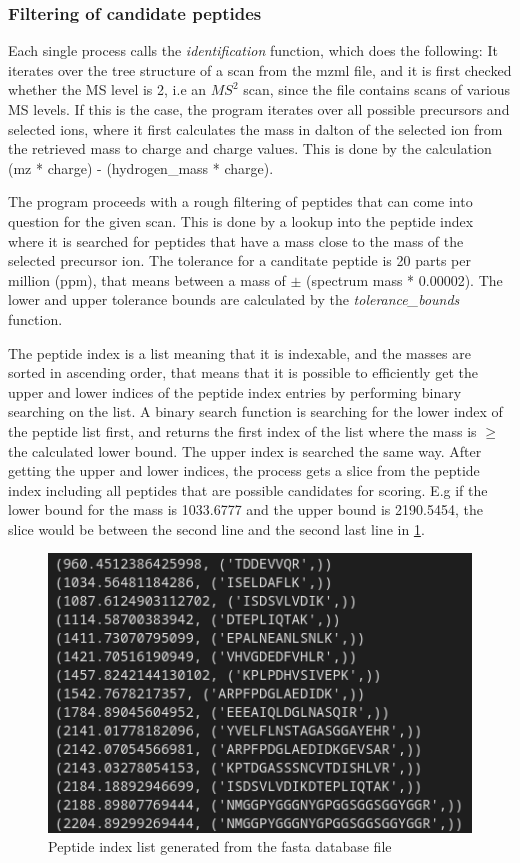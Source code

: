 \documentclass[11pt]{article}
\begin{document}
\subsubsection{Filtering of candidate peptides}
Each single process calls the \textit{identification} function, which does the following:
It iterates over the tree structure of a scan from the mzml file, and it is first checked whether the MS level is 2, i.e an \(MS^2\) scan, since the file contains scans of various MS levels. If this is the case, the program iterates over all possible precursors and selected ions, where it first calculates the mass in dalton of the selected ion from the retrieved mass to charge and charge values. This is done by the calculation (mz * charge) - (hydrogen\_mass * charge).

The program proceeds with a rough filtering of peptides that can come into question for the given scan. This is done by a lookup into the peptide index where it is searched for peptides that have a mass close to the mass of the selected precursor ion. The tolerance for a canditate peptide is 20 parts per million (ppm), that means between a mass of $\pm$ (spectrum mass * 0.00002). The lower and upper tolerance bounds are calculated by the \textit{tolerance\_bounds} function. 

The peptide index is a list meaning that it is indexable, and the masses are sorted in ascending order, that means that it is possible to efficiently get the upper and lower indices of the peptide index entries by performing binary searching on the list. A binary search function is searching for the lower index of the peptide list first, and returns the first index of the list where the mass is $\ge$ the calculated lower bound. The upper index is searched the same way. After getting the upper and lower indices, the process gets a slice from the peptide index including all peptides that are possible candidates for scoring. E.g if the lower bound for the mass is 1033.6777 and the upper bound is 2190.5454, the slice would be between the second line and the second last line in \cref{fig:peptindex}.
\begin{figure}
\includegraphics[width=\linewidth]{figs/peptindex.png} 
\caption{Peptide index list generated from the fasta database file}
\label{fig:peptindex}
\end{figure}
\end{document}
